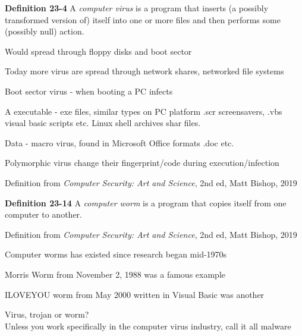 \documentclass[Screen16to9,17pt]{foils}
\begin{document}
\begin{list1}
\item {\bf Definition 23-4} A \emph{computer virus} is a program that inserts (a possibly transformed version of) itself into one or more files and then performs some (possibly null) action.
\item Would spread through floppy disks and boot sector
\item Today more virus are spread through network shares, networked file systems
\begin{list2}
\item Boot sector virus - when booting a PC infects
\item A executable - exe files, similar types on PC platform .scr screensavers, .vbs visual basic scripts etc. Linux shell archives shar files.
\item Data - macro virus, found in Microsoft Office formats .doc etc.
\end{list2}
\item Polymorphic virus change their fingerprint/code during execution/infection
\item Definition from \emph{Computer Security: Art and Science}, 2nd ed, Matt Bishop, 2019
\end{list1}



\begin{list1}
\item {\bf Definition 23-14} A \emph{computer worm} is a program that copies itself from one computer to another.
\item Definition from \emph{Computer Security: Art and Science}, 2nd ed, Matt Bishop, 2019
\item Computer worms has existed since research began mid-1970s
\item Morris Worm from November 2, 1988 was a famous example
\item ILOVEYOU worm from May 2000 written in Visual Basic was another
\vskip 2cm
\item Virus, trojan or worm?\\
Unless you work specifically in the computer virus industry, call it all malware

\end{list1}



\end{document}
